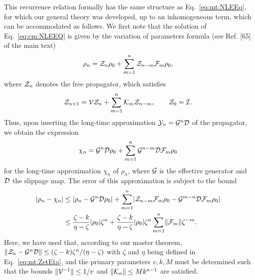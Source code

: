 \documentclass[aps,prl,reprint]{revtex4-2}
\begin{document}
This recurrence relation formally has the same structure as Eq.~\eqref{eq:mt:NLEEq}, for which our general theory was developed, up to an inhomogeneous term, which can be accommodated as follows.
We first note that the solution of Eq.~\eqref{eq:cm:NLEEQ} is given by the variation of parameters formula (see Ref. [65] of the main text)
\begin{equation}
\rho_n = \mathcal{Z}_n \rho_0 + \sum_{m=1}^n\mathcal{Z}_{n-m}\mathcal{F}_m\rho_0,
\end{equation}
where $\mathcal{Z}_n$ denotes the free propagator, which satisfies
\begin{equation}
\mathcal{Z}_{n+1} = \mathcal{V}\mathcal{Z}_n + \sum_{m=1}^n\mathcal{K}_m\mathcal{Z}_{n-m}, \qquad \mathcal{Z}_0=\mathcal{I}.
\end{equation}
Thus, upon inserting the long-time approximation $\mathcal{Y}_n = \mathcal{G}^n \mathcal{D}$ of the propagator, we obtain the expression
\begin{equation}
\chi_n = \mathcal{G}^n\mathcal{D}\rho_0 + \sum_{m=1}^n\mathcal{G}^{n-m}\mathcal{D}\mathcal{F}_m\rho_0
\end{equation}
for the long-time approximation $\chi_n$ of $\rho_n$, where $\mathcal{G}$ is the effective generator and $\mathcal{D}$ the slippage map.
The error of this approximation is subject to the bound
\begin{align}
\lvert \rho_n-\chi_n \rvert & \leq \lvert \rho_n - \mathcal{G}^n\mathcal{D}\rho_0 \rvert
+ \sum_{m=1}^n\lvert \mathcal{Z}_{n-m}\mathcal{F}_m\rho_0-\mathcal{G}^{m-n}\mathcal{D}\mathcal{F}_m\rho_0 \rvert\\
& \leq \frac{\zeta-k}{\eta-\zeta}\lvert \rho_0 \rvert\zeta^n + \frac{\zeta-k}{\eta-\zeta}\lvert \rho_0 \rvert\zeta^n\sum_{m=1}^n\lVert \mathcal{F}_m \rVert\zeta^{-m}.\nonumber
\end{align}
Here, we have used that, according to our master theorem, $\lVert \mathcal{Z}_n-\mathcal{G}^n\mathcal{D} \rVert\leq (\zeta-k)\zeta^n/(\eta-\zeta)$ with $\zeta$ and $\eta$ being defined in Eq.~\eqref{eq:mt:ZetEta}, and the primary parameters $v,k,M$ must be determined such that the bounds $\lVert \mathcal{V}^{-1} \rVert\leq 1/v$ and $\lVert \mathcal{K}_n \rVert\leq M k^{n-1}$ are satisfied.
\end{document}

